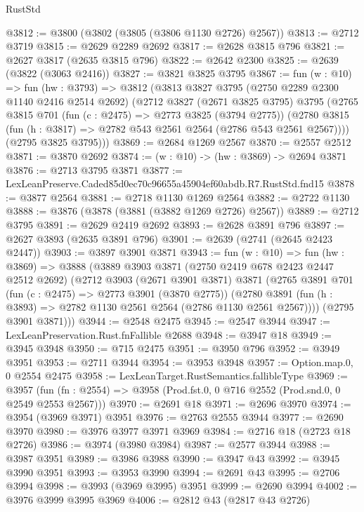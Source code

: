 \begin{lexlean}{RustStd}
\begin{coremodule}
@3812 := @3800 (@3802 (@3805 (@3806 @1130 @2726) @2567))
@3813 := @2712 @3719
@3815 := @2629 @2289 @2692
@3817 := @2628 @3815 @796
@3821 := @2627 @3817 (@2635 @3815 @796)
@3822 := @2642 @2300
@3825 := @2639 (@3822 (@3063 @2416))
@3827 := @3821 @3825 @3795
@3867 := fun (w : @10) =>
  fun (hw : @3793) =>
  @3812
    (@3813
      @3827
      @3795
      (@2750 @2289 @2300 @1140 @2416 @2514 @2692)
      (@2712
        @3827
        (@2671 @3825 @3795)
        @3795
        (@2765
          @3815
          @701
          (fun (c : @2475) => @2773 @3825 (@3794 @2775))
          (@2780 @3815 (fun (h : @3817) => @2782 @543 @2561 @2564 (@2786 @543 @2561 @2567))))
        (@2795 @3825 @3795)))
@3869 := @2684 @1269 @2567
@3870 := @2557 @2512
@3871 := @3870 @2692
@3874 := (w : @10) -> (hw : @3869) -> @2694 @3871
@3876 := @2713 @3795 @3871
@3877 := LexLeanPreserve.Caded85d0ec70c96655a45904ef60abdb.R7.RustStd.fnd15
@3878 := @3877 @2564
@3881 := @2718 @1130 @1269 @2564
@3882 := @2722 @1130
@3888 := @3876 (@3878 (@3881 (@3882 @1269 @2726) @2567))
@3889 := @2712 @3795
@3891 := @2629 @2419 @2692
@3893 := @2628 @3891 @796
@3897 := @2627 @3893 (@2635 @3891 @796)
@3901 := @2639 (@2741 (@2645 @2423 @2447))
@3903 := @3897 @3901 @3871
@3943 := fun (w : @10) =>
  fun (hw : @3869) =>
  @3888
    (@3889
      @3903
      @3871
      (@2750 @2419 @678 @2423 @2447 @2512 @2692)
      (@2712
        @3903
        (@2671 @3901 @3871)
        @3871
        (@2765
          @3891
          @701
          (fun (c : @2475) => @2773 @3901 (@3870 @2775))
          (@2780 @3891 (fun (h : @3893) => @2782 @1130 @2561 @2564 (@2786 @1130 @2561 @2567))))
        (@2795 @3901 @3871)))
@3944 := @2548 @2475
@3945 := @2547 @3944
@3947 := LexLeanPreservation.Rust.fnFallible @2688
@3948 := @3947 @18
@3949 := @3945 @3948
@3950 := @715 @2475
@3951 := @3950 @796
@3952 := @3949 @3951
@3953 := @2711 @3944
@3954 := @3953 @3948
@3957 := Option.map.{0, 0} @2554 @2475
@3958 := LexLeanTarget.RustSemantics.fallibleType
@3969 := @3957
    (fun (fn : @2554) => @3958 (Prod.fst.{0, 0} @716 @2552 (Prod.snd.{0, 0} @2549 @2553 @2567)))
@3970 := @2691 @18
@3971 := @2696 @3970
@3974 := @3954 (@3969 @3971) @3951
@3976 := @2763 @2555 @3944
@3977 := @2690 @3970
@3980 := @3976 @3977 @3971 @3969
@3984 := @2716 @18 (@2723 @18 @2726)
@3986 := @3974 (@3980 @3984)
@3987 := @2577 @3944
@3988 := @3987 @3951
@3989 := @3986 @3988
@3990 := @3947 @43
@3992 := @3945 @3990 @3951
@3993 := @3953 @3990
@3994 := @2691 @43
@3995 := @2706 @3994
@3998 := @3993 (@3969 @3995) @3951
@3999 := @2690 @3994
@4002 := @3976 @3999 @3995 @3969
@4006 := @2812 @43 (@2817 @43 @2726)

\end{coremodule}
\end{lexlean}
